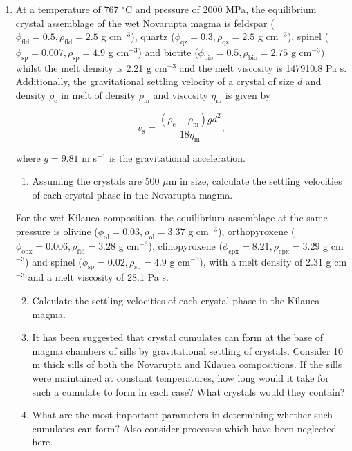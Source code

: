 \documentclass[]{book}
\theoremstyle{definition}
\begin{document}
\begin{enumerate}

\item At a temperature of 767 $^{\circ}$C and pressure of 2000 MPa, the equilibrium crystal assemblage of the wet Novarupta magma is feldspar ($\phi_{\text{fld}} = 0.5, \rho_{\text{fld}} = 2.5$ g cm$^{-3}$), quartz ($\phi_{\text{qz}} = 0.3, \rho_{\text{qz}} = 2.5$ g cm$^{-3}$), spinel ($\phi_{\text{sp}} = 0.007, \rho_{\text{sp}} = 4.9$ g cm$^{-3}$) and biotite ($\phi_{\text{bio}} = 0.5, \rho_{\text{bio}} = 2.75$ g cm$^{-3}$) whilst the melt density is 2.21 g cm$^{-3}$ and the melt viscosity is 147910.8 Pa s. Additionally, the gravitational settling velocity of a crystal of size $d$ and density $\rho_{\text{c}}$ in melt of density $\rho_{\text{m}}$ and viscosity $\eta_{\text{m}}$ is given by

  \begin{equation}
    \label{equ:Stokes}
    v_{\text{s}} = \frac{(\rho_{\text{c}} - \rho_{\text{m}}) g d^{2}}{18 \eta_{\text{m}}},
  \end{equation}

  where $g = 9.81$ m s$^{-1}$ is the gravitational acceleration. 

  \begin{enumerate}
    \setcounter{enumii}{0}
  \item Assuming the crystals are 500 $\mu$m in size, calculate the settling velocities of each crystal phase in the Novarupta magma.
  \end{enumerate}

  For the wet Kilauea composition, the equilibrium assemblage at the same pressure is olivine ($\phi_{\text{ol}} = 0.03, \rho_{\text{ol}} = 3.37$ g cm$^{-3}$), orthopyroxene ($\phi_{\text{opx}} = 0.006, \rho_{\text{fld}} = 3.28$ g cm$^{-3}$), clinopyroxene ($\phi_{\text{cpx}} = 8.21, \rho_{\text{cpx}} = 3.29$ g cm$^{-3}$) and spinel ($\phi_{\text{sp}} = 0.02, \rho_{\text{sp}} = 4.9$ g cm$^{-3}$), with a melt density of 2.31 g cm$^{-3}$ and a melt viscosity of 28.1 Pa s. 

  \begin{enumerate}
    \setcounter{enumii}{1}
  \item Calculate the settling velocities of each crystal phase in the Kilauea magma.
  \item It has been suggested that crystal cumulates can form at the base of magma chambers of sills by gravitational settling of crystals. Consider 10 m thick sills of both the Novarupta and Kilauea compositions. If the sills were maintained at constant temperatures, how long would it take for such a cumulate to form in each case? What crystals would they contain?
  \item What are the most important parameters in determining whether such cumulates can form? Also consider processes which have been neglected here.
  \end{enumerate}


\end{enumerate}
\end{document}
